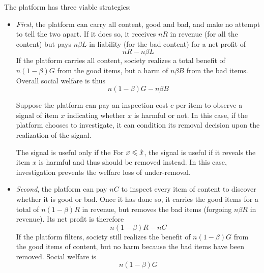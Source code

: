 The platform has three viable strategies:
\begin{itemize}

\item  \emph{First}, the platform can carry all content, good and bad, and make no attempt to tell the two apart. If it does so, it receives $nR$ in revenue (for all the content) but pays $n\beta L$ in liability (for the bad content) for a net profit of
\begin{equation}
\label{profitnofilter}
nR - n\beta L
\end{equation}
If the platform carries all content, society realizes a total benefit of $n(1-\beta)G$ from the good items, but a harm of $n\beta B$ from the bad items. Overall social welfare is thus
\begin{equation}
\label{welfarenofilter}
n(1-\beta)G - n \beta B
\end{equation}

Suppose the platform can pay an inspection cost $c$ per item to observe a signal of item $x$ indicating whether $x$ is harmful or not. In this case, if the platform chooses to investigate, it can condition its removal decision upon the realization of the signal. 

The signal is useful only if the 
For $x\leqslant \hat{x}$, the signal is useful if it reveals the item $x$ is harmful and thus should be removed instead. In this case, investigation prevents the welfare loss of under-removal. 



\item \emph{Second}, the platform can pay $nC$ to inspect every item of content to discover whether it is good or bad. Once it has done so, it carries the good items for a total of $n(1-\beta)R$ in revenue, but removes the bad items (forgoing $n\beta R$ in revenue). Its net profit is therefore 
\begin{equation}
\label{profitfilter}
n(1 - \beta)R - nC    
\end{equation}
If the platform filters, society still realizes the benefit of  $n(1-\beta)G$ from the good items of content, but no harm because the bad items have been removed. Social welfare is
\begin{equation}
\label{welfarefilter}
n(1-\beta)G
\end{equation}


\end{itemize}

